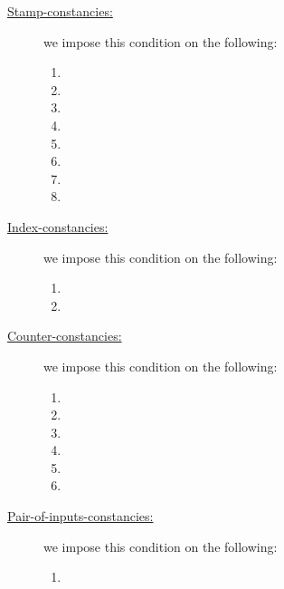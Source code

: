 \begin{description}
    \item[\underline{Stamp-constancies:}]
        we impose this condition on the following:
        \begin{multicols}{2}
            \begin{enumerate}
                \item \blsId{}
                \item \locAddressSum{}
                \item \blsSuccessBit{}
                \item[\vspace{\fill}]
                \item \malformedDataInternalTot{}
                \item \malformedDataExternalTot{}
                \item \wellformedDataTrivial{}
                \item \wellformedDataNontrivial{}
            \end{enumerate}
        \end{multicols}
    \item[\underline{Index-constancies:}]
        we impose this condition on the following:
        \begin{multicols}{1}
            \begin{enumerate}
                \item \blsPhase{}
                \item \indexMax{}
            \end{enumerate}
        \end{multicols}
    \item[\underline{Counter-constancies:}]
        we impose this condition on the following:
        \begin{multicols}{3}
            \begin{enumerate}
                \item \maxCt{}
                \item \isInfinity{}
                \item \accInputs{}
                \item \nontrivialPairOfPointsAcc{}
                \item \malformedDataExternalBit{}
                \item \malformedDataExternalAcc{}
            \end{enumerate}
        \end{multicols}
    \item[\underline{Pair-of-inputs-constancies:}]
        we impose this condition on the following:
        \begin{multicols}{3}
            \begin{enumerate}
                \item \nontrivialPairOfPointsBit{}
            \end{enumerate}
        \end{multicols}
\end{description}
